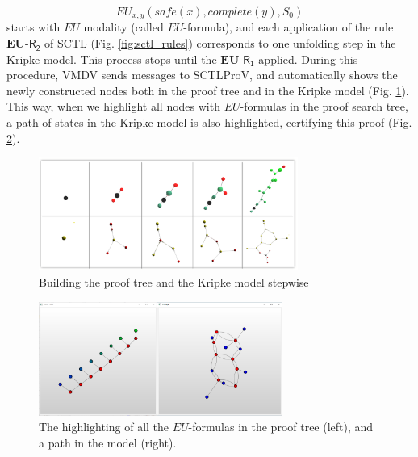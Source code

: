 \documentclass[runningheads]{llncs}
\newcommand\tool[1]{\textsf{#1}}
\newcommand\vmdv{\tool{VMDV}}
\begin{document}
$$EU_{x,y}(safe(x), complete(y), S_0)$$
starts with $EU$ modality (called $EU$-formula),
and each application of the rule $\mathbf{EU}$-$\mathsf{R_2}$ of \textsf{SCTL} (Fig. \ref{fig:sctl_rules})
corresponds to one unfolding step in the Kripke model. This process stops until the $\mathbf{EU}$-$\mathsf{R_1}$ applied.
During this procedure, \vmdv{} sends messages to \textsf{SCTLProV},
and automatically shows the newly constructed nodes both in the proof tree and in the Kripke model (Fig. \ref{fig:river_prooftreegraph_step}).
This way, when we highlight all nodes with $EU$-formulas in the proof search tree, 
a path of states in the Kripke model is also highlighted, certifying this proof (Fig. \ref{fig:river_path}).
\begin{figure}[h!]
\centering
\includegraphics[width=8.5cm]{./river_prooftreegraph_step.png}
\caption{Building the proof tree and the Kripke model stepwise}
\label{fig:river_prooftreegraph_step}
\end{figure}
\begin{figure}[h!]
\centering
\includegraphics[width=8cm]{./river_prooftreegraph_state_highlight.png}
\caption{The highlighting of all the $EU$-formulas in the proof tree (left), and a path in the model (right).}
\label{fig:river_path}
\end{figure}
 
\end{document}
